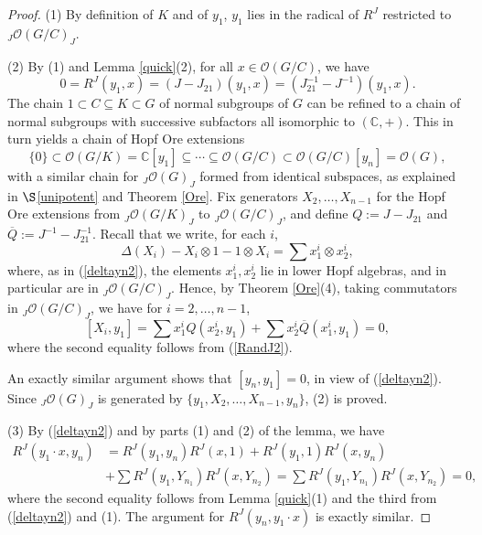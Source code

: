 \documentclass{amsart}
\numberwithin{equation}{section}
\theoremstyle{definition}
\begin{document}
\begin{proof}
(1) By definition of $K$ and of $y_1$, $y_1$ lies in the radical of $R^J$ restricted to ${}_J\mathcal{O}(G/C )_J$.

(2) By (1) and Lemma \ref{quick}(2), for all $x \in \mathcal{O} (G/C)$, we have 
\begin{equation}\label{RandJ2} 0 = R^J(y_1, x) = (J - J_{21})(y_1, x) = (J_{21}^{-1} - J^{-1})(y_1,x). 
\end{equation}
The chain $1 \subset C \subseteq K \subset G$ of normal subgroups of $G$ can be refined to a chain of normal subgroups with successive subfactors all isomorphic to $(\mathbb{C},+)$. This in turn yields a chain of Hopf Ore extensions
$$ \{0\} \subset \mathcal{O}(G/K) = \mathbb{C}[y_1] \subseteq \cdots \subseteq \mathcal{O}(G/C) \subset  \mathcal{O}(G/C)[y_n] = \mathcal{O}(G),$$
with a similar chain for ${}_J\mathcal{O}(G)_J$ formed from identical subspaces, as explained in $\S$\ref{unipotent} and Theorem \ref{Ore}. Fix generators $X_2, \ldots , X_{n-1}$ for the Hopf Ore extensions from ${}_J\mathcal{O}(G/K)_J$ to ${}_J\mathcal{O}(G/C)_J$, and define $Q := J - J_{21}$ and $\overline{Q} := J^{-1} - J^{-1}_{21}$. Recall that we write, for each $i$,
\begin{equation}\label{comformula}
\Delta (X_i) - X_i \otimes 1 - 1 \otimes X_i = \sum x^i_1 \otimes x^i_2,
\end{equation}
where, as in (\ref{deltayn2}), the elements $x^i_1, x^i_2 $ lie in lower Hopf algebras, and in particular are in ${}_J\mathcal{O}(G/C)_J$. Hence, by Theorem \ref{Ore}(4), taking commutators in ${}_J\mathcal{O}(G/C)_J$, we have for $i = 2, \ldots , n-1$,
\begin{equation}\label{comm2} 
[X_i, y_1] = \sum x^i_1 Q(x^i_2,y_1) + \sum x^i_2 \overline{Q}(x^i_1,y_1) = 0,
\end{equation}
where the second equality follows from (\ref{RandJ2}).

An exactly similar argument shows that $[y_n,y_1] = 0$, in view of (\ref{deltayn2}). Since ${}_J\mathcal{O}(G)_J$ is generated by $\{y_1, X_2, \ldots , X_{n-1}, y_n\}$, (2) is proved.

(3) By (\ref{deltayn2}) and by parts (1) and (2) of the lemma, we have
\begin{align*} R^J(y_{1}\cdot x,y_{n}) &= R^J(y_1,y_n)R^J(x,1) + R^J(y_1,1)R^J(x,y_n)\\ & + \sum R^J(y_{1},Y_{n_1})R^J(x, Y_{n_2})=\sum R^J(y_{1},Y_{n_1})R^J(x, Y_{n_2})=0,
\end{align*}
where the second equality follows from Lemma \ref{quick}(1) and the third from (\ref{deltayn2}) and (1). The argument for $R^J(y_n, y_{1}\cdot x)$ is exactly similar.


\end{proof}
\end{document}

